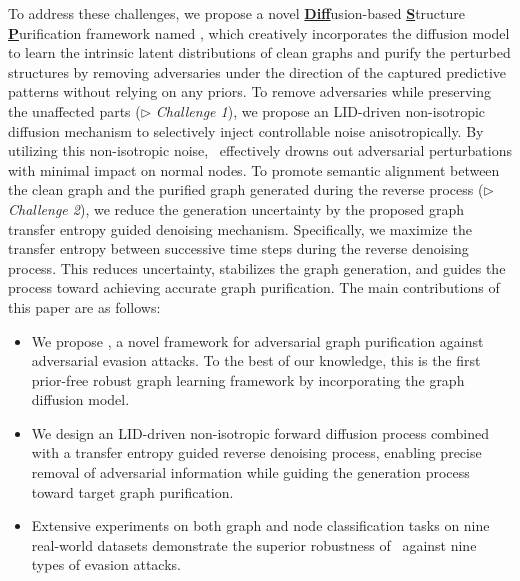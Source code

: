 To address these challenges, we propose a novel  \underline{\textbf{Diff}}usion-based \underline{\textbf{S}}tructure \underline{\textbf{P}}urification framework named \textbf{\ModelName}, which creatively incorporates
the diffusion model to learn the intrinsic latent distributions of clean graphs and purify the perturbed structures by removing adversaries under the direction of the captured predictive patterns without relying on any priors.
To remove adversaries while preserving the unaffected parts ($\rhd$ \textit{Challenge 1}), we propose an LID-driven non-isotropic diffusion mechanism to selectively inject controllable noise anisotropically.
By utilizing this non-isotropic noise, \ModelName~effectively drowns out adversarial perturbations with minimal impact on normal nodes.
To promote semantic alignment between the clean graph and the purified graph generated during the reverse process ($\rhd$ \textit{Challenge 2}), we reduce the generation uncertainty by the proposed graph transfer entropy guided denoising mechanism.
Specifically, we maximize the transfer entropy between successive time steps during the reverse denoising process. This reduces uncertainty, stabilizes the graph generation, and guides the process toward achieving accurate graph purification.
The main contributions of this paper are as follows:
\begin{itemize}[leftmargin=*]
    \item  We propose \ModelName, a novel framework for adversarial graph purification against adversarial evasion attacks. To the best of our knowledge, this is the first prior-free robust graph learning framework by incorporating the graph diffusion model.
    \item We design an LID-driven non-isotropic forward diffusion process combined with a transfer entropy guided reverse denoising process, enabling precise removal of adversarial information while guiding the generation process toward target graph purification.
    \item Extensive experiments on both graph and node classification tasks on nine real-world datasets demonstrate the superior robustness of \ModelName~against nine types of evasion attacks.
\end{itemize}



